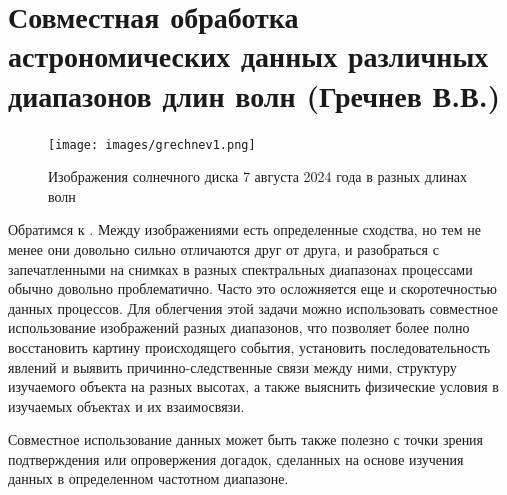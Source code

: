 
\section*{Совместная обработка астрономических данных различных диапазонов длин волн (Гречнев В.В.)}

\begin{figure}[h!]
	\centering
	\texttt{[image: images/grechnev1.png]}
	\caption{Изображения солнечного диска 7 августа 2024 года в разных длинах волн}
	\label{grechnev1}
\end{figure}

Обратимся к \cite{grechnev1}. Между изображениями есть определенные сходства, но тем не менее они довольно сильно отличаются друг от друга, и разобраться с запечатленными на снимках в разных спектральных диапазонах процессами обычно довольно проблематично. Часто это осложняется еще и скоротечностью данных процессов.
Для облегчения этой задачи можно использовать совместное использование изображений разных диапазонов, что позволяет более полно восстановить картину происходящего события, установить последовательность явлений и выявить причинно-следственные связи между ними, структуру изучаемого объекта на разных высотах, а также выяснить физические условия в изучаемых объектах и их взаимосвязи.

Совместное использование данных может быть также полезно с точки зрения подтверждения или опровержения догадок, сделанных на основе изучения данных в определенном частотном диапазоне.

